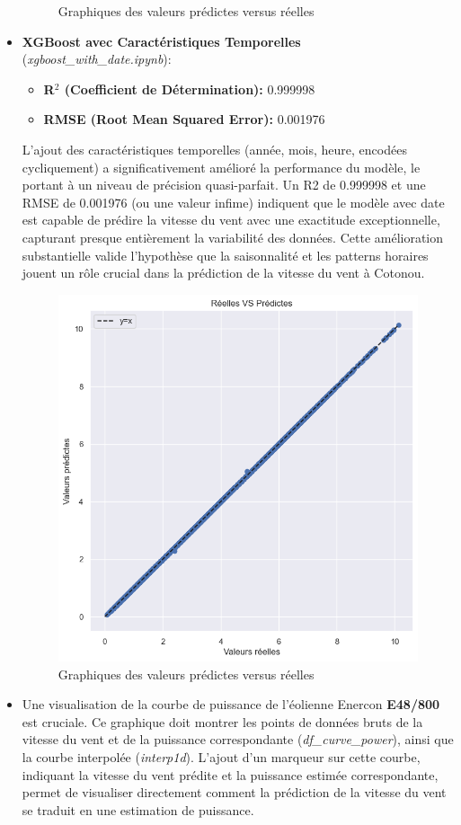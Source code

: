 \documentclass[12pt]{article}
\begin{document}
\begin{itemize}[label=$\color{blue}\ast$]
\begin{figure}[H]
		\caption{Graphiques des valeurs prédictes versus réelles}
		\label{fig:testxgboostnodate}
	\end{figure}
	\item \textbf{\color{blue}XGBoost avec Caractéristiques Temporelles} (\textit{xgboost\_with\_date.ipynb}):
	\begin{itemize}[label=$\color{blue}\triangleright$]
		\item \textbf{R$^2$ (Coefficient de Détermination):} 0.999998
		\item \textbf{RMSE (Root Mean Squared Error):} 0.001976
	\end{itemize}
	L'ajout des caractéristiques temporelles (année, mois, heure, encodées cycliquement) a significativement amélioré la performance du modèle, le portant à un niveau de précision quasi-parfait. Un R2 de 0.999998 et une RMSE de 0.001976 (ou une valeur infime) indiquent que le modèle avec date est capable de prédire la vitesse du vent avec une exactitude exceptionnelle, capturant presque entièrement la variabilité des données. Cette amélioration substantielle valide l'hypothèse que la saisonnalité et les patterns horaires jouent un rôle crucial dans la prédiction de la vitesse du vent à Cotonou.
	\begin{figure}[H]
		\centering
		\includegraphics[width=0.7\linewidth]{../graphique/test_xgboost_with_date}
		\caption{Graphiques des valeurs prédictes versus réelles}
		\label{fig:testxgboostwithdate}
	\end{figure}
	\item Une visualisation de la courbe de puissance de l'éolienne Enercon \textbf{E48/800} est cruciale. Ce graphique doit montrer les points de données bruts de la vitesse du vent et de la puissance correspondante (\textit{df\_curve\_power}), ainsi que la courbe interpolée (\textit{interp1d}). L'ajout d'un marqueur sur cette courbe, indiquant la vitesse du vent prédite et la puissance estimée correspondante, permet de visualiser directement comment la prédiction de la vitesse du vent se traduit en une estimation de puissance.

\end{itemize}
\end{document}

